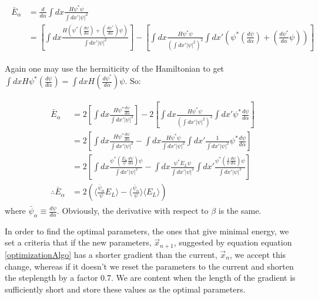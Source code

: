 \documentclass[english, a4paper]{article}
\begin{document}
	\begin{align}
	\begin{split}
	\bar{E}_\alpha &= \frac{d}{d\alpha}\int dx \frac{H\psi^*\psi}{\int dx'|\psi|^2}\\
	&= \left[ \int dx\frac{H\left(\psi^*\left(\frac{d\psi}{d\alpha}\right) + \left(\frac{d\psi^*}{d\alpha}\right)\psi\right)}{\int dx'|\psi|^2} \right] - \left[ \int dx \frac{H\psi^*\psi}{\left(\int dx'|\psi|^2\right)^2}\int dx'\left( \psi^*\left(\frac{d\psi}{d\alpha}\right) + \left(\frac{d\psi^*}{d\alpha}\psi\right) \right) \right]
	\end{split}
	\end{align}
	
	Again one may use the hermiticity of the Hamiltonian to get $\int dx H \psi^*\left(\frac{d\psi}{d\alpha}\right) = \int dx H \left(\frac{d\psi^*}{d\alpha}\right)\psi$. So:
	
	\begin{align}
	\begin{split}
	\bar{E}_\alpha &= 2\left[ \int dx\frac{H\psi^*\frac{d\psi}{d\alpha}}{\int dx'|\psi|^2} \right] - 2\left[ \int dx \frac{H\psi^*\psi}{\left(\int dx'|\psi|^2\right)^2}\int dx' \psi^*\frac{d\psi}{d\alpha} \right]\\
	&= 2\left[ \int dx\frac{H\psi^*\frac{d\psi}{d\alpha}}{\int dx'|\psi|^2} - \int dx \frac{H\psi^*\psi}{\int dx'|\psi|^2}\int dx' \frac{1}{\int dx'|\psi|^2}\psi^*\frac{d\psi}{d\alpha} \right]\\
	&= 2\left[ \int dx\frac{\psi^*\left(\frac{E_L}{\psi}\frac{d\psi}{d\alpha}\right) \psi}{\int dx'|\psi|^2} - \int dx \frac{\psi^* E_L\psi}{\int dx'|\psi|^2}\int dx' \frac{\psi^*\left(\frac{1}{\psi}\frac{d\psi}{d\alpha}\right)\psi}{\int dx'|\psi|^2} \right]\\
	\therefore \bar{E}_\alpha &= 2\left( \langle\frac{\bar{\psi}_\alpha}{\psi}E_L\rangle -  \langle\frac{\bar{\psi}_\alpha}{\psi}\rangle\langle E_L\rangle \right)
	\end{split}
	\end{align}
	where $\bar{\psi}_\alpha \equiv \frac{d\psi}{d\alpha}$. Obviously, the derivative with respect to $\beta$ is the same.
	
	
	In order to find the optimal parameters, the ones that give minimal energy, we set a criteria that if the new parameters, $\vec{x}_{n+1}$, suggested by equation equation \ref{optimizationAlgo} has a shorter gradient than the current, $\vec{x}_n$, we accept this change, whereas if it doesn't we reset the parameters to the current and shorten the steplength by a factor 0.7. We are content when the length of the gradient is sufficiently short and store these values as the optimal parameters. 
	
\end{document}
